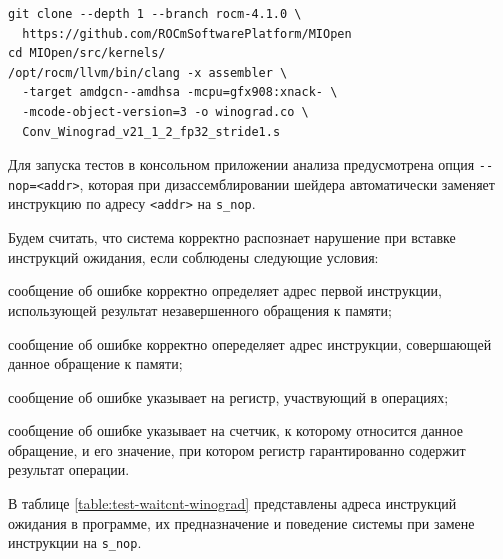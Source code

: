 \documentclass[a4paper,14pt]{extarticle}
\begin{document}
{\begin{verbatim}
git clone --depth 1 --branch rocm-4.1.0 \
  https://github.com/ROCmSoftwarePlatform/MIOpen
cd MIOpen/src/kernels/
/opt/rocm/llvm/bin/clang -x assembler \
  -target amdgcn--amdhsa -mcpu=gfx908:xnack- \
  -mcode-object-version=3 -o winograd.co \
  Conv_Winograd_v21_1_2_fp32_stride1.s
\end{verbatim}

Для запуска тестов в консольном приложении анализа предусмотрена опция
\verb|--nop=<addr>|, которая при дизассемблировании шейдера автоматически
заменяет инструкцию по адресу \verb|<addr>| на \verb|s_nop|.

Будем считать, что система корректно распознает нарушение при вставке инструкций
ожидания, если соблюдены следующие условия:
\begin{ul}
\item сообщение об ошибке корректно определяет адрес первой инструкции, использующей результат
незавершенного обращения к памяти;
\item сообщение об ошибке корректно опеределяет адрес инструкции, совершающей данное обращение к памяти;
\item сообщение об ошибке указывает на регистр, участвующий в операциях;
\item сообщение об ошибке указывает на счетчик, к которому относится данное обращение, и его значение,
при котором регистр гарантированно содержит результат операции.
\end{ul}

В таблице \ref{table:test-waitcnt-winograd} представлены адреса инструкций ожидания
в программе, их предназначение и поведение системы при замене инструкции на \verb|s_nop|.

}
\end{document}
